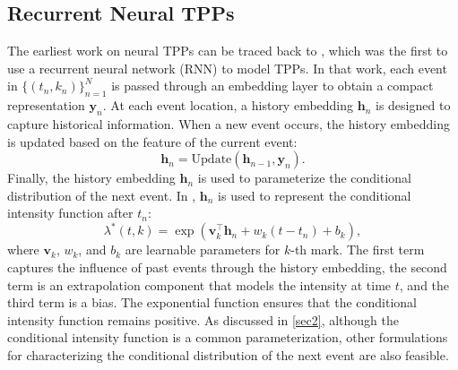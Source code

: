 \documentclass[10pt]{article} %
\begin{document}
\subsection{Recurrent Neural TPPs}
\label{recurrent}
The earliest work on neural TPPs can be traced back to \citet{du2016recurrent}, which was the first to use a recurrent neural network (RNN) to model TPPs.  
In that work, each event in $\{(t_n, k_n)\}_{n=1}^N$ is passed through an embedding layer to obtain a compact representation $\mathbf{y}_n$. 
At each event location, a history embedding $\mathbf{h}_n$ is designed to capture historical information. 
When a new event occurs, the history embedding is updated based on the feature of the current event:
\begin{equation}
    \mathbf{h}_n = \text{Update}(\mathbf{h}_{n-1}, \mathbf{y}_n).
\end{equation} 
Finally, the history embedding \(\mathbf{h}_n\) is used to parameterize the conditional distribution of the next event. In \citet{du2016recurrent}, \(\mathbf{h}_n\) is used to represent the conditional intensity function after $t_n$: 
\begin{equation}
\lambda^*(t, k) = \exp{\left(\mathbf{v}_k^\top\mathbf{h}_n + w_k(t - t_n) + b_k\right)},
\label{rnn_intensity}
\end{equation}
where $\mathbf{v}_k$, $w_k$, and $b_k$ are learnable parameters for $k$-th mark. The first term captures the influence of past events through the history embedding, the second term is an extrapolation component that models the intensity at time $t$, and the third term is a bias. The exponential function ensures that the conditional intensity function remains positive. 
As discussed in \cref{sec2}, although the conditional intensity function is a common parameterization, other formulations for characterizing the conditional distribution of the next event are also feasible. 
\end{document}
